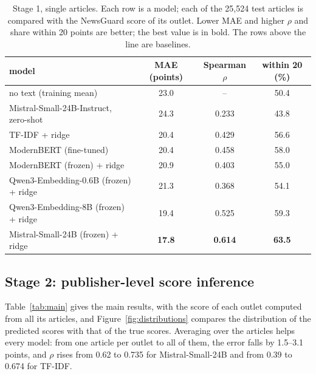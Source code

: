 \documentclass[11pt,a4paper]{article}
\begin{document}
\begin{table}[t]
\centering
\caption{Stage 1, single articles. Each row is a model; each of the 25,524 test articles is compared with the NewsGuard
score of its outlet. Lower MAE and higher $\rho$ and share within 20 points are better; the best value is in bold. The
rows above the line are baselines.}\label{tab:article}
\begin{tabular}{lccc}
\toprule
model & MAE (points) & Spearman $\rho$ & within 20 (\%) \\
\midrule
no text (training mean) & 23.0 & -- & 50.4 \\
Mistral-Small-24B-Instruct, zero-shot & 24.3 & 0.233 & 43.8 \\
\midrule
TF-IDF + ridge & 20.4 & 0.429 & 56.6 \\
ModernBERT (fine-tuned) & 20.4 & 0.458 & 58.0 \\
ModernBERT (frozen) + ridge & 20.9 & 0.403 & 55.0 \\
Qwen3-Embedding-0.6B (frozen) + ridge & 21.3 & 0.368 & 54.1 \\
Qwen3-Embedding-8B (frozen) + ridge & 19.4 & 0.525 & 59.3 \\
Mistral-Small-24B (frozen) + ridge & \textbf{17.8} & \textbf{0.614} & \textbf{63.5} \\
\bottomrule
\end{tabular}
\end{table}

\subsection{Stage 2: publisher-level score inference}\label{sec:stage2}
Table~\ref{tab:main} gives the main results, with the score of each outlet computed from all its articles, and
Figure~\ref{fig:distributions} compares the distribution of the predicted scores with that of the true scores. Averaging over the articles helps every model: from one article per
outlet to all of them, the error falls by 1.5--3.1 points, and $\rho$ rises from 0.62 to 0.735 for Mistral-Small-24B
and from 0.39 to 0.674 for TF-IDF.
\end{document}
